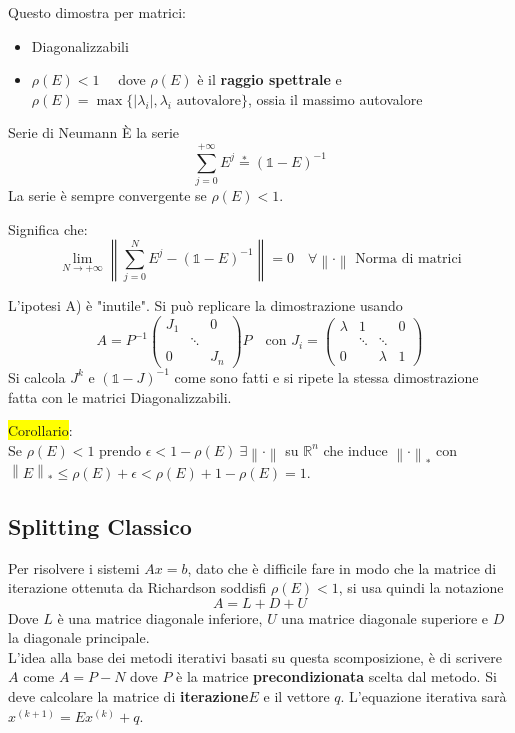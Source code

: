\documentclass{article}
\begin{document}
Questo dimostra per matrici:
\begin{itemize}
    \item [A)] Diagonalizzabili
    \item [B)] $\rho(E)<1\quad$ dove $\rho(E)$ è il \textbf{raggio spettrale} e $\rho(E)=\max\{\left|\lambda_i\right|,\lambda_i\text{ autovalore}\}$, ossia il massimo autovalore
\end{itemize}

\begin{defi}{Serie di Neumann}{}
    È la serie\[\sum_{j=0}^{+\infty}E^j\overset{*}{=}\left(\mathbb 1-E\right)^{-1}\]
    La serie è sempre convergente se $\rho(E)<1$.
\end{defi}
Significa che:\[\lim_{N\to+\infty}\left\|\sum_{j=0}^{N}E^j-\left(\mathbb 1-E\right)^{-1}\right\|=0\quad\forall\left\|\cdot\right\|\text{ Norma di matrici}\]

L'ipotesi A) è "inutile". Si può replicare la dimostrazione usando \[A=P^{-1}\begin{pmatrix}
        J_1 &        & 0   \\
            & \ddots       \\
        0   &        & J_n
    \end{pmatrix}P\quad\text{con }J_i=\begin{pmatrix}
        \lambda & 1      &         & 0 \\
                & \ddots & \ddots      \\
        0       &        & \lambda & 1
    \end{pmatrix}\]
Si calcola $J^k$ e $\left(\mathbb 1-J\right)^{-1}$ come sono fatti e si ripete la stessa dimostrazione fatta con le matrici Diagonalizzabili.

\colorbox{yellow}{Corollario}:\\
Se $\rho(E)<1$ prendo $\epsilon<1-\rho(E)\ \exists\left\|\cdot\right\|$ su $\mathbb R^n$ che induce
$\left\|\cdot\right\|_\ast$ con $\left\|E\right\|_\ast\le\rho(E)+\epsilon<\rho(E)+1-\rho(E)=1$.

\subsection{Splitting Classico}
Per risolvere i sistemi $Ax=b$, dato che è difficile fare in modo che la matrice di iterazione ottenuta da Richardson soddisfi $\rho(E)<1$, si usa quindi la notazione
\[\boxed{A=L+D+U}\]
Dove $L$ è una matrice diagonale inferiore, $U$ una matrice diagonale superiore e $D$ la diagonale principale.\\
L'idea alla base dei metodi iterativi basati su questa scomposizione, è di scrivere $A$ come $A=P-N$ dove $P$ è la matrice \textbf{precondizionata} scelta dal metodo. Si deve calcolare
la matrice di \textbf{iterazione}$E$ e il vettore $q$. L'equazione iterativa sarà $x^{(k+1)}=Ex^{(k)}+q$.
\end{document}
